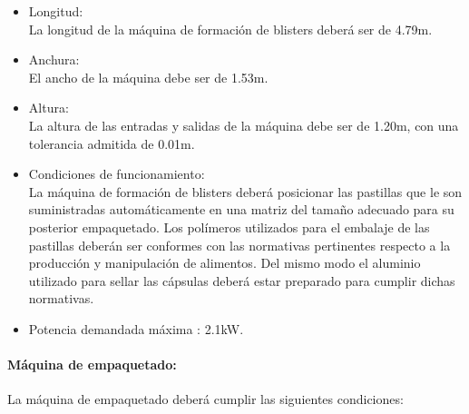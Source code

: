 		\begin{itemize}
			\item{Longitud:}\\
			La longitud de la máquina de formación de blisters deberá ser de 4.79m.  

			\item{Anchura:}\\
			El ancho de la máquina debe ser de 1.53m.
			
			\item{Altura:}\\
			La altura de las entradas y salidas de la máquina debe ser de 1.20m, con una tolerancia admitida de 0.01m.
			
			
			\item{Condiciones de funcionamiento: }\\
			La máquina de formación de blisters deberá posicionar las pastillas que le son suministradas automáticamente en una matriz del tamaño adecuado para su posterior empaquetado. Los polímeros utilizados para el embalaje de las pastillas deberán ser conformes con las normativas pertinentes respecto a la producción y manipulación de alimentos. Del mismo modo el aluminio utilizado para sellar las cápsulas deberá estar preparado para cumplir dichas normativas. 

			

			\item{Potencia demandada máxima :} 2.1kW.
		
		\end{itemize}		


\paragraph{Máquina de empaquetado:}
		La máquina de empaquetado deberá cumplir las siguientes condiciones:
		
